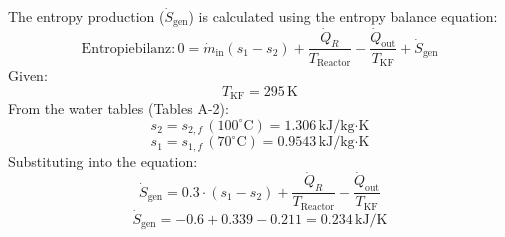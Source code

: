 The entropy production (\( \dot{S}_{\text{gen}} \)) is calculated using the entropy balance equation:  
\[
\text{Entropiebilanz:} \, 0 = \dot{m}_{\text{in}} (s_1 - s_2) + \frac{\dot{Q}_R}{T_{\text{Reactor}}} - \frac{\dot{Q}_{\text{out}}}{T_{\text{KF}}} + \dot{S}_{\text{gen}}
\]  
Given:  
\[
T_{\text{KF}} = 295 \, \text{K}
\]  
From the water tables (Tables A-2):  
\[
s_2 = s_{2,f} \, (100^\circ\text{C}) = 1.306 \, \text{kJ/kg·K}
\]  
\[
s_1 = s_{1,f} \, (70^\circ\text{C}) = 0.9543 \, \text{kJ/kg·K}
\]  
Substituting into the equation:  
\[
\dot{S}_{\text{gen}} = 0.3 \cdot (s_1 - s_2) + \frac{\dot{Q}_R}{T_{\text{Reactor}}} - \frac{\dot{Q}_{\text{out}}}{T_{\text{KF}}}
\]  
\[
\dot{S}_{\text{gen}} = -0.6 + 0.339 - 0.211 = 0.234 \, \text{kJ/K}
\]